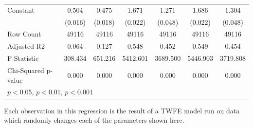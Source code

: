 \documentclass[12pt]{article}
\begin{document}
\begin{landscape}
\begin{table}[htbp]
{\begin{tabular}{l*{6}{c}}
Constant            &       0.504\sym{***}&       0.475\sym{***}&       1.671\sym{***}&       1.271\sym{***}&       1.686\sym{***}&       1.304\sym{***}\\
                    &     (0.016)         &     (0.018)         &     (0.022)         &     (0.048)         &     (0.022)         &     (0.048)         \\
\hline
Row Count           &   49116         &   49116         &   49116         &   49116         &   49116         &   49116         \\
Adjusted R2         &       0.064         &       0.127         &       0.548         &       0.452         &       0.549         &       0.454         \\
F Statistic         &     308.434         &     651.216         &    5412.601         &    3689.500         &    5446.903         &    3719.808         \\
Chi-Squared p-value &       0.000         &       0.000         &       0.000         &       0.000         &       0.000         &       0.000         \\
\hline\hline
\multicolumn{7}{l}{\footnotesize \sym{*} \(p<0.05\), \sym{**} \(p<0.01\), \sym{***} \(p<0.001\)}\\
\end{tabular}
}
\footnotesize  
\vspace{5mm}
    \footnotesize \begin{singlespace*}
        Each observation in this regression is the result of a TWFE model run on data which randomly changes each of the parameters shown here.
    \end{singlespace*}
\end{table}
\end{landscape}
\end{document}
